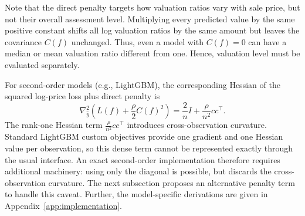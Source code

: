 \documentclass[10pt]{article}
\theoremstyle{definition}
\newcommand{\1}{\mathbf{1}}
\begin{document}
Note that the direct penalty targets how valuation ratios vary with sale price, but not their overall assessment level. Multiplying every predicted value by the same positive constant shifts all log valuation ratios by the same amount but leaves the covariance $C(f)$ unchanged. Thus, even a model with $C(f)=0$ can have a median or mean valuation ratio different from one. Hence, valuation level must be evaluated separately.



{For second-order models (e.g., LightGBM), the corresponding Hessian of the squared log-price loss plus direct penalty is}
{
\begin{equation}
\label{eq:direct_gradient_hessian}
\nabla_{\widehat y}^2
\left(
L(f)+\frac{\rho}{2}C(f)^2
\right)
=
\frac{2}{n}I+\frac{\rho}{n^2}cc^\top.
\end{equation}
}
The rank-one Hessian term $\frac{\rho}{n^{2}}cc^\top$ introduces cross-observation curvature. Standard LightGBM custom objectives provide one gradient and one Hessian value per observation, so this dense term cannot be represented exactly through the usual interface. An exact second-order implementation therefore requires additional machinery: using only the diagonal is possible, but discards the cross-observation curvature. The next subsection proposes an alternative penalty term to handle this caveat. Further, the model-specific derivations are given in Appendix~\ref{app:implementation}.

\end{document}
